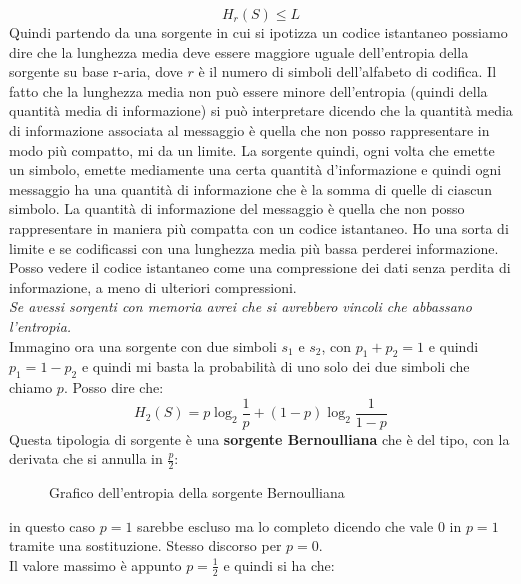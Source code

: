 \documentclass[a4paper,12pt, oneside]{book}
\begin{document}
\[H_r(S)\leq L\]
Quindi partendo da una sorgente in cui si ipotizza un codice istantaneo possiamo
dire che la lunghezza media deve essere maggiore uguale dell'entropia della
sorgente su base r-aria, dove $r$ è il numero di simboli dell'alfabeto di
codifica. Il fatto che la lunghezza media non può essere minore dell'entropia
(quindi della quantità media di informazione)
si può interpretare dicendo che la quantità media di informazione associata al
messaggio è quella che non posso rappresentare in modo più compatto, mi da un
limite. La sorgente quindi, ogni volta che emette un simbolo, emette mediamente
una certa quantità d'informazione e quindi ogni messaggio ha una quantità di
informazione che è la somma di quelle di ciascun simbolo. La quantità di
informazione del messaggio è quella che non posso rappresentare in maniera più
compatta con un codice istantaneo. Ho una sorta di limite e se codificassi con
una lunghezza media più bassa perderei informazione. Posso vedere il codice
istantaneo come una compressione dei dati senza perdita di informazione, a meno
di ulteriori compressioni.\\
\textit{Se avessi sorgenti con memoria avrei che si avrebbero vincoli che
  abbassano l'entropia.} \\
Immagino ora una sorgente con due simboli $s_1$ e $s_2$, con $p_1+p_2=1$ e
quindi $p_1=1-p_2$ e quindi mi basta la probabilità di uno solo dei due simboli
che chiamo $p$. Posso dire che:
\[H_2(S)=p\log_2\frac{1}{p}+(1-p)\log_2\frac{1}{1-p}\]
Questa tipologia di sorgente è una \textbf{sorgente Bernoulliana} che è del
tipo, con la derivata che si annulla in $\frac{p}{2}$:
\begin{figure}[H]
  \centering
  \caption{Grafico dell'entropia della sorgente Bernoulliana}
  \label{fig:ber}
\end{figure}
in questo caso $p=1$ sarebbe escluso ma lo completo dicendo che vale 0 in $p=1$
tramite una sostituzione. Stesso discorso per $p=0$. \\
Il valore massimo è appunto $p=\frac{1}{2}$ e quindi si ha che:
\end{document}
